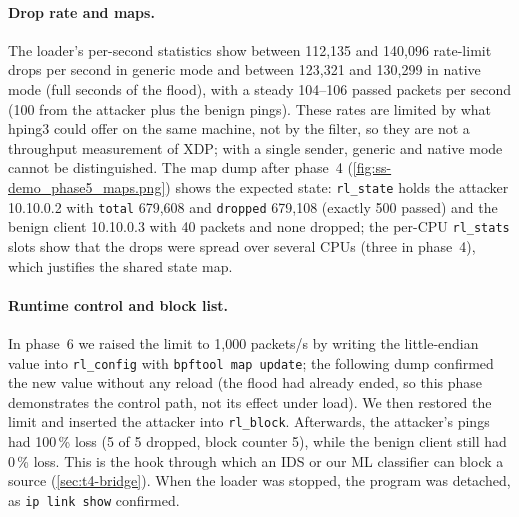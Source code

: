 \paragraph{Drop rate and maps.} The loader's per-second statistics show between 112,135 and 140,096 rate-limit drops per second in generic mode and between 123,321 and 130,299 in native mode (full seconds of the flood), with a steady 104--106 passed packets per second (100 from the attacker plus the benign pings). These rates are limited by what hping3 could offer on the same machine, not by the filter, so they are not a throughput measurement of XDP; with a single sender, generic and native mode cannot be distinguished. The map dump after phase~4 (\cref{fig:ss-demo_phase5_maps.png}) shows the expected state: \texttt{rl\_state} holds the attacker 10.10.0.2 with \texttt{total} 679,608 and \texttt{dropped} 679,108 (exactly 500 passed) and the benign client 10.10.0.3 with 40 packets and none dropped; the per-CPU \texttt{rl\_stats} slots show that the drops were spread over several CPUs (three in phase~4), which justifies the shared state map.

\paragraph{Runtime control and block list.} In phase~6 we raised the limit to 1,000 packets/s by writing the little-endian value into \texttt{rl\_config} with \texttt{bpftool map update}; the following dump confirmed the new value without any reload (the flood had already ended, so this phase demonstrates the control path, not its effect under load). We then restored the limit and inserted the attacker into \texttt{rl\_block}. Afterwards, the attacker's pings had 100\,\% loss (5 of 5 dropped, block counter 5), while the benign client still had 0\,\% loss. This is the hook through which an IDS or our ML classifier can block a source (\cref{sec:t4-bridge}). When the loader was stopped, the program was detached, as \texttt{ip link show} confirmed.



